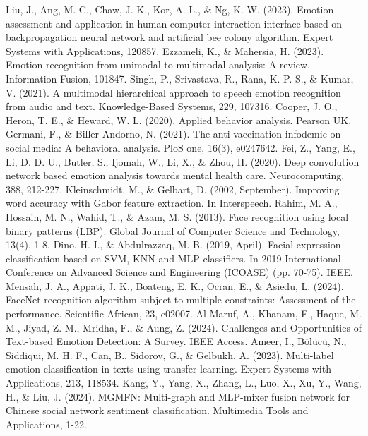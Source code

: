 \documentclass[preprint,12pt]{elsarticle}
\begin{document}
\begin{thebibliography}{99}

 Liu, J., Ang, M. C., Chaw, J. K., Kor, A. L., \& Ng, K. W. (2023). Emotion assessment and application in human-computer interaction interface based on backpropagation neural network and artificial bee colony algorithm. Expert Systems with Applications, 120857.
 Ezzameli, K., \& Mahersia, H. (2023). Emotion recognition from unimodal to multimodal analysis: A review. Information Fusion, 101847.
 Singh, P., Srivastava, R., Rana, K. P. S., \& Kumar, V. (2021). A multimodal hierarchical approach to speech emotion recognition from audio and text. Knowledge-Based Systems, 229, 107316.
 Cooper, J. O., Heron, T. E., \& Heward, W. L. (2020). Applied behavior analysis. Pearson UK.
 Germani, F., \& Biller-Andorno, N. (2021). The anti-vaccination infodemic on social media: A behavioral analysis. PloS one, 16(3), e0247642.
 Fei, Z., Yang, E., Li, D. D. U., Butler, S., Ijomah, W., Li, X., \& Zhou, H. (2020). Deep convolution network based emotion analysis towards mental health care. Neurocomputing, 388, 212-227.
 Kleinschmidt, M., \& Gelbart, D. (2002, September). Improving word accuracy with Gabor feature extraction. In Interspeech.
 Rahim, M. A., Hossain, M. N., Wahid, T., \& Azam, M. S. (2013). Face recognition using local binary patterns (LBP). Global Journal of Computer Science and Technology, 13(4), 1-8.
 Dino, H. I., \& Abdulrazzaq, M. B. (2019, April). Facial expression classification based on SVM, KNN and MLP classifiers. In 2019 International Conference on Advanced Science and Engineering (ICOASE) (pp. 70-75). IEEE.
 Mensah, J. A., Appati, J. K., Boateng, E. K., Ocran, E., \& Asiedu, L. (2024). FaceNet recognition algorithm subject to multiple constraints: Assessment of the performance. Scientific African, 23, e02007.
 Al Maruf, A., Khanam, F., Haque, M. M., Jiyad, Z. M., Mridha, F., \& Aung, Z. (2024). Challenges and Opportunities of Text-based Emotion Detection: A Survey. IEEE Access.
 Ameer, I., Bölücü, N., Siddiqui, M. H. F., Can, B., Sidorov, G., \& Gelbukh, A. (2023). Multi-label emotion classification in texts using transfer learning. Expert Systems with Applications, 213, 118534.
 Kang, Y., Yang, X., Zhang, L., Luo, X., Xu, Y., Wang, H., \& Liu, J. (2024). MGMFN: Multi-graph and MLP-mixer fusion network for Chinese social network sentiment classification. Multimedia Tools and Applications, 1-22.

\end{thebibliography}
\end{document}
